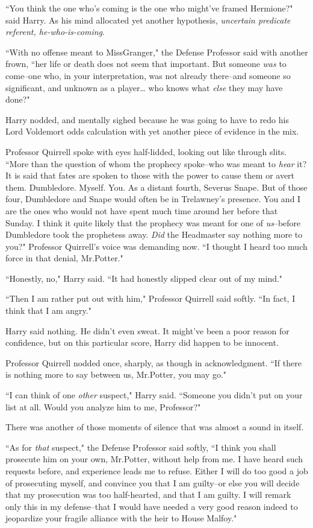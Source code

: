 ``You think the one who's coming is the one who might've framed Hermione?" said Harry. As his mind allocated yet another hypothesis, \emph{uncertain predicate referent, he-who-is-coming}.

``With no offense meant to Miss\?Granger," the Defense Professor said with another frown, ``her life or death does not seem that important. But someone \emph{was} to come\---one who, in your interpretation, was not already there\---and someone so significant, and unknown as a player{\ldots} who knows what \emph{else} they may have done?"

Harry nodded, and mentally sighed because he was going to have to redo his Lord Voldemort odds calculation with yet another piece of evidence in the mix.

Professor Quirrell spoke with eyes half-lidded, looking out like through slits. ``More than the question of whom the prophecy spoke\---who was meant to \emph{hear} it? It is said that fates are spoken to those with the power to cause them or avert them. Dumbledore. Myself. You. As a distant fourth, Severus Snape. But of those four, Dumbledore and Snape would often be in Trelawney's presence. You and I are the ones who would not have spent much time around her before that Sunday. I think it quite likely that the prophecy was meant for one of \emph{us}\---before Dumbledore took the prophetess away. \emph{Did} the Headmaster say nothing more to you?" Professor Quirrell's voice was demanding now. ``I thought I heard too much force in that denial, Mr.\?Potter."

``Honestly, no," Harry said. ``It had honestly slipped clear out of my mind."

``Then I am rather put out with him," Professor Quirrell said softly. ``In fact, I think that I am angry."

Harry said nothing. He didn't even sweat. It might've been a poor reason for confidence, but on this particular score, Harry did happen to be innocent.

Professor Quirrell nodded once, sharply, as though in acknowledgment. ``If there is nothing more to say between us, Mr.\?Potter, you may go."

``I can think of one \emph{other} suspect," Harry said. ``Someone you didn't put on your list at all. Would you analyze him to me, Professor?"

There was another of those moments of silence that was almost a sound in itself.

``As for \emph{that} suspect," the Defense Professor said softly, ``I think you shall prosecute him on your own, Mr.\?Potter, without help from me. I have heard such requests before, and experience leads me to refuse. Either I will do too good a job of prosecuting myself, and convince you that I am guilty\---or else you will decide that my prosecution was too half-hearted, and that I am guilty. I will remark only this in my defense\---that I would have needed a very good reason indeed to jeopardize your fragile alliance with the heir to House Malfoy."

